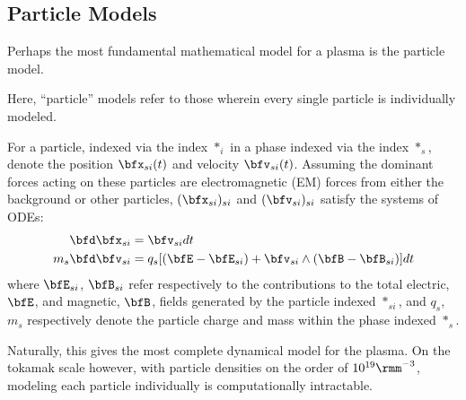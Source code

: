 \subsection{Particle Models}
    Perhaps the most fundamental mathematical model for a plasma is the particle model.

    \line

    \begin{definition}\label{def:particle model}
        Here, ``particle'' models refer to those wherein every single particle is individually modeled.
    \end{definition}
    
    \line

    For a particle, indexed via the index $*_{i}$ in a phase indexed via the index $*_{s}$, denote the position $\bfx_{si}(t)$ and velocity $\bfv_{si}(t)$. Assuming the dominant forces acting on these particles are electromagnetic (EM) forces from either the background or other particles, $(\bfx_{si})_{si}$ and $(\bfv_{si})_{si}$ satisfy the systems of ODEs:
    \begin{align}
        \bfd\bfx_{si}  &=  \bfv_{si} dt  \label{eqn:particle motion}  \\
        m_{s}\bfd\bfv_{si}  &=  q_{s}[(\bfE - \bfE_{si}) + \bfv_{si}\wedge(\bfB - \bfB_{si})]dt  \label{eqn:particle forcing}
    \end{align}
    where $\bfE_{si}$, $\bfB_{si}$ refer respectively to the contributions to the total electric, $\bfE$, and magnetic, $\bfB$, fields generated by the particle indexed $*_{si}$, and $q_{s}$, $m_{s}$ respectively denote the particle charge and mass within the phase indexed $*_{s}$.

    
    Naturally, this gives the most complete dynamical model for the plasma. On the tokamak scale however, with particle densities on the order of $10^{19}\rmm^{- 3}$, modeling each particle individually is computationally intractable.
    